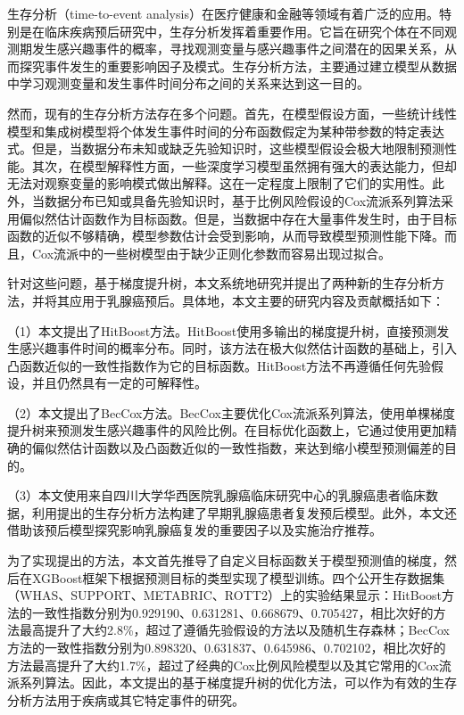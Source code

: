 	
\begin{chineseabstract}
    生存分析（time-to-event analysis）在医疗健康和金融等领域有着广泛的应用。特别是在临床疾病预后研究中，生存分析发挥着重要作用。它旨在研究个体在不同观测期发生感兴趣事件的概率，寻找观测变量与感兴趣事件之间潜在的因果关系，从而探究事件发生的重要影响因子及模式。生存分析方法，主要通过建立模型从数据中学习观测变量和发生事件时间分布之间的关系来达到这一目的。

    然而，现有的生存分析方法存在多个问题。首先，在模型假设方面，一些统计线性模型和集成树模型将个体发生事件时间的分布函数假定为某种带参数的特定表达式。但是，当数据分布未知或缺乏先验知识时，这些模型假设会极大地限制预测性能。其次，在模型解释性方面，一些深度学习模型虽然拥有强大的表达能力，但却无法对观察变量的影响模式做出解释。这在一定程度上限制了它们的实用性。此外，当数据分布已知或具备先验知识时，基于比例风险假设的Cox流派系列算法采用偏似然估计函数作为目标函数。但是，当数据中存在大量事件发生时，由于目标函数的近似不够精确，模型参数估计会受到影响，从而导致模型预测性能下降。而且，Cox流派中的一些树模型由于缺少正则化参数而容易出现过拟合。

    针对这些问题，基于梯度提升树，本文系统地研究并提出了两种新的生存分析方法，并将其应用于乳腺癌预后。具体地，本文主要的研究内容及贡献概括如下：

    （1）本文提出了HitBoost方法。HitBoost使用多输出的梯度提升树，直接预测发生感兴趣事件时间的概率分布。同时，该方法在极大似然估计函数的基础上，引入凸函数近似的一致性指数作为它的目标函数。HitBoost方法不再遵循任何先验假设，并且仍然具有一定的可解释性。
    
    （2）本文提出了BecCox方法。BecCox主要优化Cox流派系列算法，使用单棵梯度提升树来预测发生感兴趣事件的风险比例。在目标优化函数上，它通过使用更加精确的偏似然估计函数以及凸函数近似的一致性指数，来达到缩小模型预测偏差的目的。
    
    （3）本文使用来自四川大学华西医院乳腺癌临床研究中心的乳腺癌患者临床数据，利用提出的生存分析方法构建了早期乳腺癌患者复发预后模型。此外，本文还借助该预后模型探究影响乳腺癌复发的重要因子以及实施治疗推荐。

    为了实现提出的方法，本文首先推导了自定义目标函数关于模型预测值的梯度，然后在XGBoost框架下根据预测目标的类型实现了模型训练。四个公开生存数据集（WHAS、SUPPORT、METABRIC、ROTT2）上的实验结果显示：HitBoost方法的一致性指数分别为0.929190、0.631281、0.668679、0.705427，相比次好的方法最高提升了大约2.8\%，超过了遵循先验假设的方法以及随机生存森林；BecCox方法的一致性指数分别为0.898320、0.631837、0.645986、0.702102，相比次好的方法最高提升了大约1.7\%，超过了经典的Cox比例风险模型以及其它常用的Cox流派系列算法。因此，本文提出的基于梯度提升树的优化方法，可以作为有效的生存分析方法用于疾病或其它特定事件的研究。

\end{chineseabstract}

